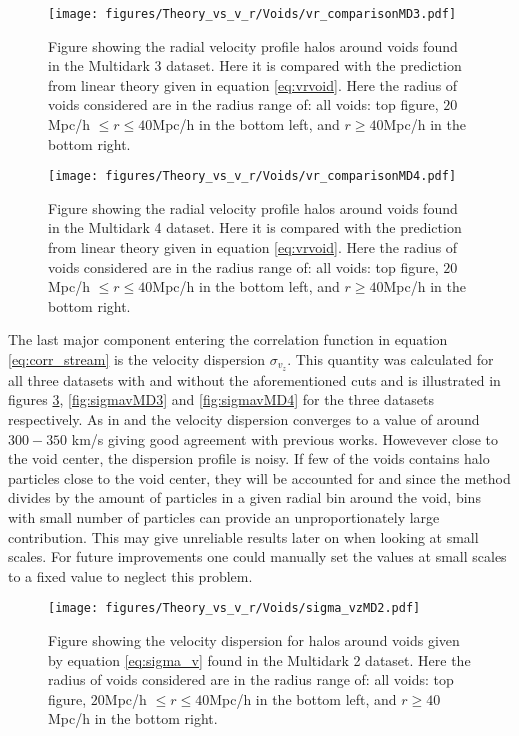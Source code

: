 \begin{figure}[H]
    \texttt{[image: figures/Theory\_vs\_v\_r/Voids/vr\_comparisonMD3.pdf]}
    \caption{Figure showing the radial velocity profile halos around voids found in the Multidark 3 dataset. Here it is compared with the prediction from linear theory given in equation \ref{eq:vrvoid}. Here the radius of voids considered are in the radius range of: all voids: top figure, $20$Mpc/h $\leq r\leq 40$Mpc/h in the bottom left, and $r\geq 40$Mpc/h in the bottom right.}
    \label{fig:vrMD3}
\end{figure}

\begin{figure}[H]
    \texttt{[image: figures/Theory\_vs\_v\_r/Voids/vr\_comparisonMD4.pdf]}
    \caption{Figure showing the radial velocity profile halos around voids found in the Multidark 4 dataset. Here it is compared with the prediction from linear theory given in equation \ref{eq:vrvoid}. Here the radius of voids considered are in the radius range of: all voids: top figure, $20$Mpc/h $\leq r\leq 40$Mpc/h in the bottom left, and $r\geq 40$Mpc/h in the bottom right.}
    \label{fig:vrMD4}
\end{figure}
The last major component entering the correlation function in equation \ref{eq:corr_stream} is the velocity dispersion $\sigma_{v_z}$. This quantity was calculated for all three datasets with and without the aforementioned cuts and is illustrated in figures \ref{fig:sigmavMD2}, \ref{fig:sigmavMD3} and \ref{fig:sigmavMD4} for the three datasets respectively. As in \cite{Nadathur_corr} and \cite{Achitouv_streaming} the velocity dispersion converges to a value of around $300-350$ km/s giving good agreement with previous works. Howevever close to the void center, the dispersion profile is noisy. If few of the voids contains halo particles close to the void center, they will be accounted for and since the method divides by the amount of particles in a given radial bin around the void, bins with small number of particles can provide an unproportionately large contribution. This may give unreliable results later on when looking at small scales. For future improvements one could manually set the values at small scales to a fixed value to neglect this problem.
\begin{figure}[H]
    \texttt{[image: figures/Theory\_vs\_v\_r/Voids/sigma\_vzMD2.pdf]}
    \caption{Figure showing the velocity dispersion for halos around voids given by equation \ref{eq:sigma_v} found in the Multidark 2 dataset. Here the radius of voids considered are in the radius range of: all voids: top figure, $20$Mpc/h $\leq r\leq 40$Mpc/h in the bottom left, and $r\geq 40$Mpc/h in the bottom right.}
    \label{fig:sigmavMD2}
\end{figure}

